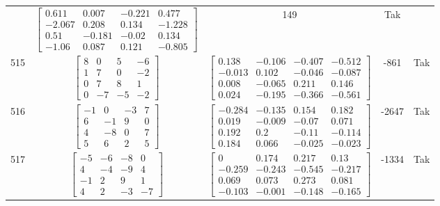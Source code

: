 \documentclass[a4paper,12pt]{article}
\begin{document}
\begin{tabular}{c c c c c}
&
$\begin{bmatrix} 0.611 & 0.007 & -0.221 & 0.477 \\ -2.067 & 0.208 & 0.134 & -1.228 \\ 0.51 & -0.181 & -0.02 & 0.134 \\ -1.06 & 0.087 & 0.121 & -0.805 \end{bmatrix}$
&
149
&
Tak
\\
515
&
$\begin{bmatrix} 8 & 0 & 5 & -6 \\ 1 & 7 & 0 & -2 \\ 0 & 7 & 8 & 1 \\ 0 & -7 & -5 & -2 \end{bmatrix}$
&
$\begin{bmatrix} 0.138 & -0.106 & -0.407 & -0.512 \\ -0.013 & 0.102 & -0.046 & -0.087 \\ 0.008 & -0.065 & 0.211 & 0.146 \\ 0.024 & -0.195 & -0.366 & -0.561 \end{bmatrix}$
&
-861
&
Tak
\\
516
&
$\begin{bmatrix} -1 & 0 & -3 & 7 \\ 6 & -1 & 9 & 0 \\ 4 & -8 & 0 & 7 \\ 5 & 6 & 2 & 5 \end{bmatrix}$
&
$\begin{bmatrix} -0.284 & -0.135 & 0.154 & 0.182 \\ 0.019 & -0.009 & -0.07 & 0.071 \\ 0.192 & 0.2 & -0.11 & -0.114 \\ 0.184 & 0.066 & -0.025 & -0.023 \end{bmatrix}$
&
-2647
&
Tak
\\
517
&
$\begin{bmatrix} -5 & -6 & -8 & 0 \\ 4 & -4 & -9 & 4 \\ -1 & 2 & 9 & 1 \\ 4 & 2 & -3 & -7 \end{bmatrix}$
&
$\begin{bmatrix} 0 & 0.174 & 0.217 & 0.13 \\ -0.259 & -0.243 & -0.545 & -0.217 \\ 0.069 & 0.073 & 0.273 & 0.081 \\ -0.103 & -0.001 & -0.148 & -0.165 \end{bmatrix}$
&
-1334
&
Tak
\\

\end{tabular}
\end{document}

